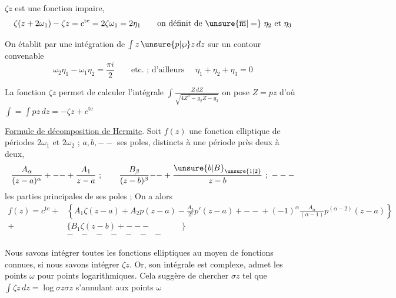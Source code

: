 $\zeta z$ est une fonction impaire,  
\[
\zeta(z+2\omega_1)-\zeta z=c^{\mathrm{te}}=2\zeta\omega_1=2\eta_1\qquad
\text{on définit de }\unsure{\overline{\mathrm m}|=}\ \eta_2\text{ et }\eta_3
\]

On établit par une intégration de $\int z\,\unsure{p|\wp}z\,dz$ sur un contour convenable
\[
\omega_2\eta_1-\omega_1\eta_2=\frac{\pi i}{2}\qquad\text{etc. ; d'ailleurs }\quad\eta_1+\eta_2+\eta_3=0
\]

La fonction $\zeta z$ permet de calculer l'intégrale $\displaystyle\int\frac{Z\,dZ}{\sqrt{4Z^3-g_2Z-g_3}}$ on pose $Z=pz$ d'où $\displaystyle\int=\int pz\,dz=-\zeta z+c^{\mathrm{te}}$


\uline{Formule de décomposition de Hermite}. Soit $f(z)$ une fonction elliptique de périodes $2\omega_1$ et $2\omega_2$ ; $a,b,\mathord{--}$ ses poles, distincts à une période près deux à deux,
\[
\frac{A_\alpha}{(z-a)^\alpha}+\mathord{--}+\frac{A_1}{z-a}\ ;\qquad
\frac{B_\beta}{(z-b)^\beta}\mathord{--}+\frac{\unsure{b|B}_{\unsure{1|2}}}{z-b}\ ;\ \mathord{---}
\]
les parties principales de ses poles ; On a alors
\[
\begin{aligned}
f(z)=c^{\mathrm{te}}+{}&\left\{A_1\zeta(z-a)+A_2p(z-a)-\frac{A_3}{2!}p'(z-a)+\mathord{--}+(-1)^\alpha\frac{A_\alpha}{(\alpha-1)}p^{(\alpha-2)}(z-a)\right\}\\
+{}&\{B_1\zeta(z-b)+\mathord{---}\qquad\qquad\}\\
&\mathord{-}\quad\mathord{-}\quad\mathord{-}\quad\mathord{-}\quad\mathord{-}\quad\mathord{-}\quad\mathord{-}
\end{aligned}
\]

 Nous savons intégrer toutes les fonctions elliptiques au moyen de fonctions connues, si nous savons intégrer $\zeta z$. Or, son intégrale est complexe,  admet  les points $\omega$ pour points logarithmiques. Cela suggère de chercher $\sigma z$ tel que $\int\zeta z\,dz=\log\sigma z$\qquad $\sigma z$ s'annulant aux points $\omega$\unsure{--}

